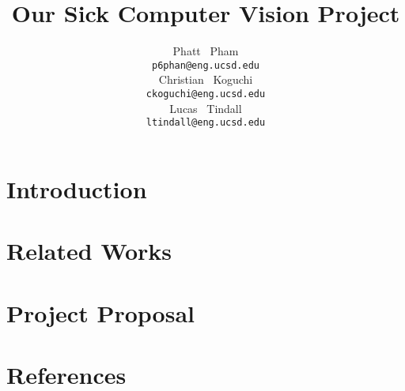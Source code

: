 \documentclass{article} %
\title{Our Sick Computer Vision Project}
\author{
Phatt ~Pham\\
\texttt{p6phan@eng.ucsd.edu} \\ \And
Christian ~Koguchi\\
\texttt{ckoguchi@eng.ucsd.edu} \\ \And
Lucas ~Tindall\\
\texttt{ltindall@eng.ucsd.edu} \\ 
}
\begin{document}
\maketitle

\begin{abstract}

\end{abstract}

\section{Introduction}



\section{Related Works}



\section{Project Proposal}




\section{References}


\end{document}
